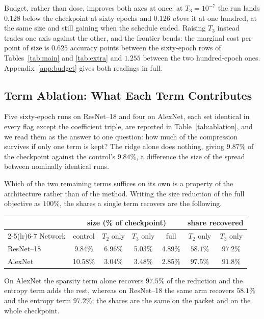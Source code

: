 \documentclass{article}
\begin{document}
Budget, rather than dose, improves both axes at once: at $T_3=10^{-7}$ the run
lands $0.128$ below the checkpoint at sixty epochs and $0.126$ \emph{above} it at
one hundred, at the same size and still gaining when the schedule ended. Raising
$T_3$ instead trades one axis against the other, and the frontier bends: the
marginal cost per point of size is $0.625$ accuracy points between the
sixty-epoch rows of Tables~\ref{tab:main} and \ref{tab:extra} and $1.255$ between
the two hundred-epoch ones. Appendix~\ref{app:budget} gives both
readings in full.

\subsection{Term Ablation: What Each Term Contributes}
\label{sec:term-ablation}

Five sixty-epoch runs on ResNet--18 and four on AlexNet, each set identical in
every flag except the coefficient triple, are reported in
Table~\ref{tab:ablation}, and we read them as the answer to one question: how much
of the compression survives if only one term is kept? The ridge alone does
nothing, giving $9.87\%$ of the checkpoint against the control's $9.84\%$, a
difference the size of the spread between nominally identical runs.

Which of the two remaining terms suffices on its own is a property of the
architecture rather than of the method. Writing the size reduction of the full
objective as $100\%$, the shares a single term recovers are the following.

\begin{center}
\small
\begin{tabular}{lcccccc}
  \toprule
  & \multicolumn{4}{c}{size (\% of checkpoint)} & \multicolumn{2}{c}{share recovered} \\
  \cmidrule(lr){2-5}\cmidrule(lr){6-7}
  Network & control & $T_2$ only & $T_3$ only & full & $T_2$ only & $T_3$ only \\
  \midrule
  ResNet--18 & 9.84\% & 6.96\% & 5.03\% & 4.89\% & $58.1\%$ & $\mathbf{97.2\%}$ \\
  AlexNet    & 10.58\% & 3.04\% & 3.48\% & 2.85\% & $\mathbf{97.5\%}$ & $91.8\%$ \\
  \bottomrule
\end{tabular}
\end{center}

On AlexNet the sparsity term alone recovers $97.5\%$ of the reduction and the
entropy term adds the rest, whereas on ResNet--18 the same arm recovers $58.1\%$
and the entropy term $97.2\%$; the shares are the same on the packet and on the
whole checkpoint.
\end{document}
